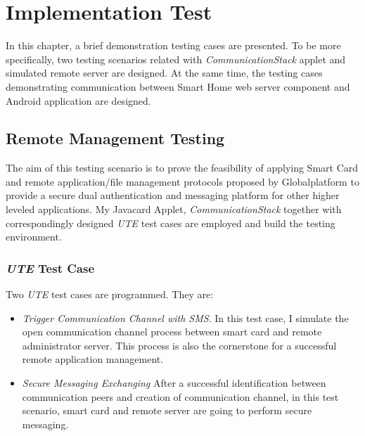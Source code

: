 \chapter{Implementation Test}
In this chapter, a brief demonstration testing cases are presented. To be more specifically, two testing scenarios related with \emph{CommunicationStack} applet and simulated remote server are designed. At the same time, the testing cases demonstrating communication between Smart Home web server component and Android application are designed.

\section{Remote Management Testing}
The aim of this testing scenario is to prove the feasibility of applying Smart Card and remote application/file management protocols proposed by Globalplatform to provide a secure dual authentication and messaging platform for other 
higher leveled applications. My Javacard Applet, \emph{CommunicationStack} together with correspondingly designed \emph{UTE} test cases are employed and build the testing environment.

\subsection{\emph{UTE} Test Case}

Two \emph{UTE} test cases are programmed. They are:
\begin{itemize}
\item \emph{Trigger Communication Channel with SMS}. In this test case, I simulate the open communication channel process between smart card and remote administrator server. This process is also the cornerstone for a successful remote application management.
\item \emph{Secure Messaging Exchanging} After a successful identification between communication peers and creation of communication channel, in this test scenario, smart card and remote server are going to perform secure messaging. 
\end{itemize}

